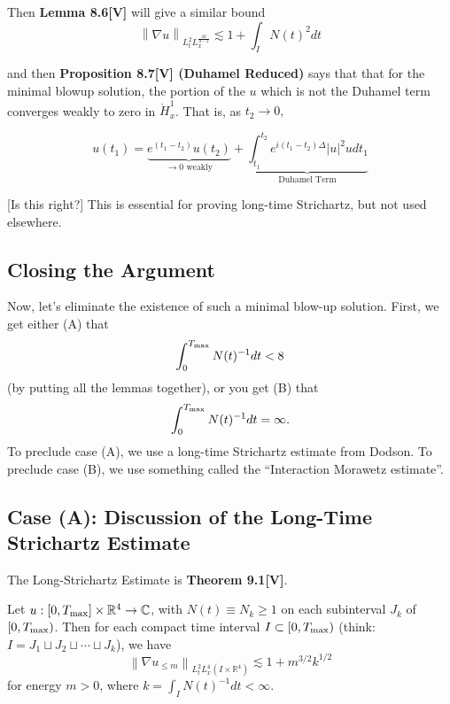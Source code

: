 \documentclass{article}
\def\purple{\color{Purple}}
\newcommand{\pnote}[1]{{\purple [#1]}} %
\def\R{\mathbb{R}} %
\newcommand\norm[1]{\left\lVert#1\right\rVert}
\begin{document}
Then \textbf{Lemma 8.6[V]} will give a similar bound
\begin{equation*}
  \norm{\nabla u}_{L_{t}^{2}L_{x}^{\frac{2d}{d-2}}} \lesssim 1 + \int_{I}N(t)^{2}dt 
\end{equation*}

and then \textbf{Proposition 8.7[V] (Duhamel Reduced)} says that that for the minimal
blowup solution, the portion of the $u$ which is not the Duhamel term converges
weakly to zero in $\mathring{H}_{x}^{1}$. That is, as $t_{2}\to 0,$

\begin{equation*}
  u(t_{1}) 
  = \underbrace{e^{(t_{1}-t_{2})}u(t_{2})}_{\to 0 \text{ weakly}} +
    \underbrace{\int_{t_{1}}^{t_{2}}e^{i(t_{1}-t_{2})\Delta }|u|^{2}u
    dt_{1}}_{\text{Duhamel Term}}
\end{equation*}

\pnote{Is this right?}
This is essential for proving long-time Strichartz, but not used elsewhere.



\subsection{Closing the Argument}
Now, let's eliminate the existence of such a minimal blow-up solution. First, we
get either (A) that
\begin{equation*}
  \int_{0}^{T_{\rm max}}N(t)^{-1} dt <8 
\end{equation*}
(by putting all the lemmas together), or you get (B) that
\begin{equation}\label{eq:19-caseb}
  \int_{0}^{T_{\rm max}} N(t)^{-1}dt = \infty.
\end{equation}
To preclude case (A), we use a long-time Strichartz estimate from Dodson. To
preclude case (B), we use something called the ``Interaction Morawetz
estimate''.

\subsection{Case (A): Discussion of the Long-Time Strichartz Estimate}

The Long-Strichartz Estimate is \textbf{Theorem 9.1[V]}.

Let $u: [0,T_{\rm max}]\times \R^{4}\to \mathbb{C}$, with $N(t) \equiv N_{k}
\geq 1$ on each subinterval $J_{k}$ of $[0,T_{\rm max})$. Then for each compact
time interval $I\subset [0,T_{\rm max})$ (think: $I=J_{1}\sqcup J_{2}\sqcup
\cdots \sqcup J_{k}$), we have
\begin{equation*}
  \norm{\nabla u_{ \leq  m}}_{L_{t}^{2}L_{x}^{4}(I\times \R^4)}\lesssim1 + m^{3/2}k^{1/2}
\end{equation*}
for energy $m>0$, where $k = \int_{I} N(t)^{-1}dt<\infty$.
\end{document}
